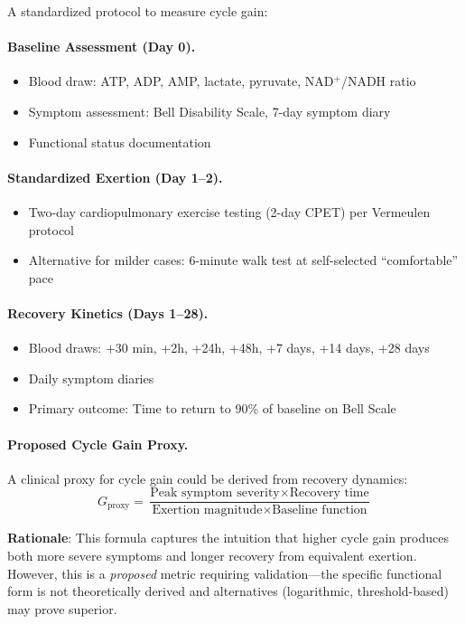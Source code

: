 A standardized protocol to measure cycle gain:

\paragraph{Baseline Assessment (Day 0).}
\begin{itemize}
    \item Blood draw: ATP, ADP, AMP, lactate, pyruvate, NAD$^+$/NADH ratio
    \item Symptom assessment: Bell Disability Scale, 7-day symptom diary
    \item Functional status documentation
\end{itemize}

\paragraph{Standardized Exertion (Day 1--2).}
\begin{itemize}
    \item Two-day cardiopulmonary exercise testing (2-day CPET) per Vermeulen protocol
    \item Alternative for milder cases: 6-minute walk test at self-selected ``comfortable'' pace
\end{itemize}

\paragraph{Recovery Kinetics (Days 1--28).}
\begin{itemize}
    \item Blood draws: +30 min, +2h, +24h, +48h, +7 days, +14 days, +28 days
    \item Daily symptom diaries
    \item Primary outcome: Time to return to 90\% of baseline on Bell Scale
\end{itemize}

\paragraph{Proposed Cycle Gain Proxy.}
A clinical proxy for cycle gain could be derived from recovery dynamics:
$$G_{\text{proxy}} = \frac{\text{Peak symptom severity} \times \text{Recovery time}}{\text{Exertion magnitude} \times \text{Baseline function}}$$

\textbf{Rationale}: This formula captures the intuition that higher cycle gain produces both more severe symptoms and longer recovery from equivalent exertion. However, this is a \textit{proposed} metric requiring validation---the specific functional form is not theoretically derived and alternatives (logarithmic, threshold-based) may prove superior.

